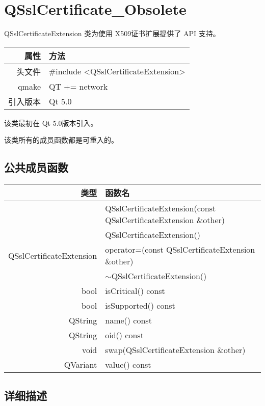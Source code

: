 \chapter{QSslCertificate\_Obsolete}

QSslCertificateExtension 类为使用 X509证书扩展提供了 API 支持。

\begin{tabular}{|r|l|}
	\hline
	属性 & 方法 \\
	\hline
	头文件 & \#include <QSslCertificateExtension>\\      
	\hline
	qmake & QT += network\\      
	\hline
	引入版本 &	Qt 5.0 \\ 
	\hline
\end{tabular}

该类最初在 Qt 5.0版本引入。

\begin{notice}
该类所有的成员函数都是可重入的。
\end{notice}

\section{公共成员函数}


\begin{tabular}{|r|m{20em}|}
\hline 
类型 	& 函数名 \\ 
\hline
&QSslCertificateExtension(const QSslCertificateExtension \&other) \\
\hline
&QSslCertificateExtension()\\
\hline
QSslCertificateExtension & 	operator=(const QSslCertificateExtension \&other) \\
\hline
&$\sim$QSslCertificateExtension() \\ 
\hline
bool 	&isCritical() const \\ 
\hline
bool 	&isSupported() const \\ 
\hline
QString &	name() const \\ 
\hline
QString &	oid() const \\ 
\hline
void 	&swap(QSslCertificateExtension \&other) \\ 
\hline
QVariant 	&value() const \\ 
\hline
\end{tabular}




\section{详细描述}

